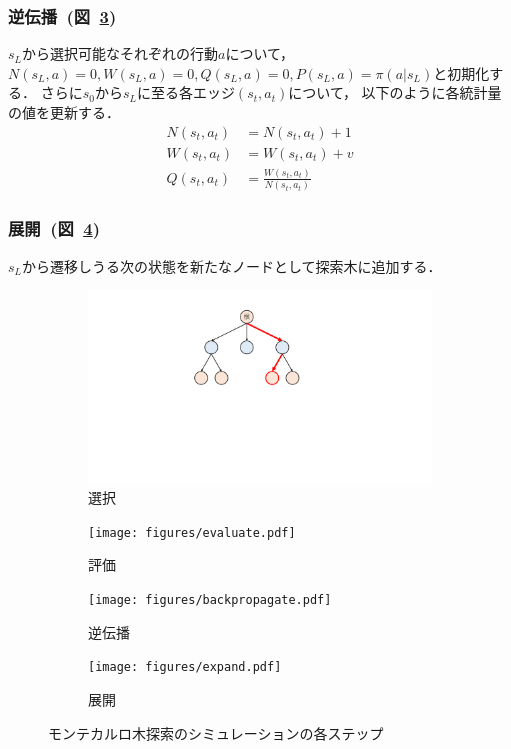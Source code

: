 \subsubsection*{逆伝播~(図~\ref{fig:backpropagate})}
$s_L$から選択可能なそれぞれの行動$a$について， $N(s_L, a)=0, W(s_L, a)=0, Q(s_L, a)=0, P(s_L, a)=\pi(a|s_L)$と初期化する．
さらに$s_0$から$s_L$に至る各エッジ$(s_t,a_t)$について， 以下のように各統計量の値を更新する．
\begin{align*}
  N(s_t, a_t) &= N(s_t, a_t)+1 \\
  W(s_t, a_t) &= W(s_t, a_t) + v \\
  Q(s_t, a_t) &= \frac{W(s_t,a_t)}{N(s_t,a_t)}
\end{align*}

\subsubsection*{展開~(図~\ref{fig:expand})}
$s_L$から遷移しうる次の状態を新たなノードとして探索木に追加する．

\begin{figure}
  \begin{subfigure}[t]{0.4\columnwidth}
    \centering
    \includegraphics[width=\columnwidth]{figures/selection.pdf}
    \caption{選択}
    \label{fig:selection}
  \end{subfigure}
  \begin{subfigure}[t]{0.4\columnwidth}
    \centering
    \texttt{[image: figures/evaluate.pdf]}
    \caption{評価}
    \label{fig:evaluate}
  \end{subfigure}
  \begin{subfigure}[t]{0.4\columnwidth}
    \centering
    \texttt{[image: figures/backpropagate.pdf]}
    \caption{逆伝播}
    \label{fig:backpropagate}
  \end{subfigure}
  \begin{subfigure}[t]{0.4\columnwidth}
    \centering
    \texttt{[image: figures/expand.pdf]}
    \caption{展開}
    \label{fig:expand}
  \end{subfigure}
  \caption{モンテカルロ木探索のシミュレーションの各ステップ}
  \label{fig:mcts}
\end{figure}

